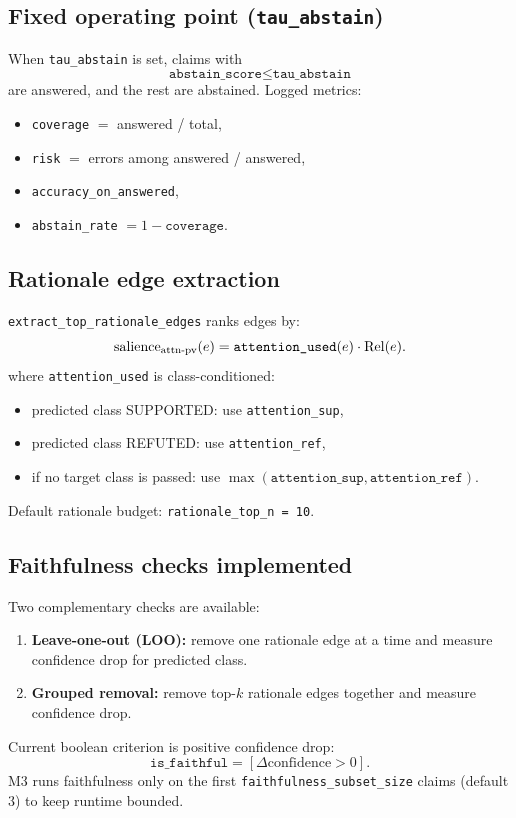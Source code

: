 \subsection{Fixed operating point (\texttt{tau\_abstain})}
When \texttt{tau\_abstain} is set, claims with
\[
\texttt{abstain\_score} \le \texttt{tau\_abstain}
\]
are answered, and the rest are abstained.
Logged metrics:
\begin{itemize}
\item \texttt{coverage} $=$ answered / total,
\item \texttt{risk} $=$ errors among answered / answered,
\item \texttt{accuracy\_on\_answered},
\item \texttt{abstain\_rate} $=1-\texttt{coverage}$.
\end{itemize}

\subsection{Rationale edge extraction}
\texttt{extract\_top\_rationale\_edges} ranks edges by:
\[
\text{salience}_{\text{attn-pv}}(e)=\texttt{attention\_used}(e)\cdot \operatorname{Rel}(e).
\]
where \texttt{attention\_used} is class-conditioned:
\begin{itemize}
\item predicted class SUPPORTED: use \texttt{attention\_sup},
\item predicted class REFUTED: use \texttt{attention\_ref},
\item if no target class is passed: use $\max(\texttt{attention\_sup},\texttt{attention\_ref})$.
\end{itemize}
Default rationale budget: \texttt{rationale\_top\_n = 10}.

\subsection{Faithfulness checks implemented}
Two complementary checks are available:
\begin{enumerate}
\item \textbf{Leave-one-out (LOO):} remove one rationale edge at a time and measure confidence drop for predicted class.
\item \textbf{Grouped removal:} remove top-$k$ rationale edges together and measure confidence drop.
\end{enumerate}

Current boolean criterion is positive confidence drop:
\[
\texttt{is\_faithful} = [\Delta\text{confidence} > 0].
\]
M3 runs faithfulness only on the first \texttt{faithfulness\_subset\_size} claims (default $3$) to keep runtime bounded.

